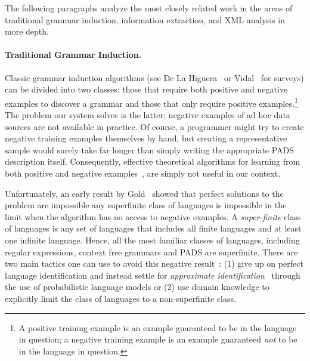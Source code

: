 \noindent
The following paragraphs analyze
the most closely related work in the areas of
traditional grammar induction, information extraction, and XML analysis
in more depth.

\paragraph*{Traditional Grammar Induction.}
Classic grammar induction algorithms (see De La Higuera~\cite{higuera01current}
or Vidal~\cite{vidal:gisurvey} for surveys) can be divided into two classes:
those that require both positive and negative examples to discover a grammar
and those that only require positive examples.\footnote{A positive training
example is an example guaranteed to be in the language in question;
a negative training example is an example guaranteed {\em not} to be in the 
language in question.}  The problem our system solves is the latter; 
negative examples of ad hoc data sources are not available in practice.  
Of course, a programmer might try to create
negative training examples themselves by hand, but creating a representative
sample would surely take far longer than simply writing
the appropriate PADS description itself.  Consequently, effective theoretical
algorithms for learning from both positive and negative examples~\cite{rpni,denis:learning-regular-languages,lemay+:tree-transducers,raeymaekers+:learning-tree-languages}, are 
simply not useful in our context.  

Unfortunately, an early result by Gold~\cite{gold:inference} 
showed that perfect solutions to the problem
are impossible any superfinite class of languages is 
impossible in the limit when the algorithm has no access to negative 
examples.  A {\em super-finite} class of languages is any set of languages
that includes all finite languages and at least one infinite language. Hence,
all the most familiar classes of languages, including regular expressions, 
context free grammars and PADS are superfinite.  There are two
main tactics one can use to avoid this negative result~\cite{vidal:gisurvey}:
(1) give up on perfect language identification and instead
settle for 
{\em approximate identification}~\cite{wharton:approximate-language-identification} through the use of probabilistic language
models or (2) use domain knowledge to explicitly limit the class of languages
to a non-superfinite class.  

